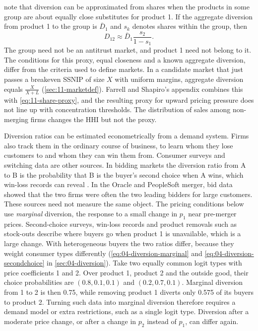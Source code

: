  \citet[Section 2.G]{FarrellShapiro2010} note that diversion can be approximated from
shares when the products in some group are about equally close substitutes for product 1. If the aggregate
diversion from product 1 to the group is $\bar D_1$ and $s_k$ denotes shares within the group, then
\begin{equation}\label{eq:11-share-proxy}
  D_{12} \approx \bar D_1 \frac{s_2}{1 - s_1} .
\end{equation}
The group need not be an antitrust market, and product 1 need not belong to it. The conditions for this proxy, equal
closeness and a known aggregate diversion, differ from the criteria used to define markets. In a candidate market
that just passes a breakeven SSNIP of size $X$ with uniform margins, aggregate diversion equals $\frac{X}{X + L}$
(\cref{sec:11-marketdef}). Farrell and Shapiro's appendix combines this with \eqref{eq:11-share-proxy}, and the
resulting proxy for upward pricing pressure does not line up with concentration thresholds. The distribution of
sales among non-merging firms changes the HHI but not the proxy.

 Diversion ratios can be estimated econometrically from a demand system. Firms also track
them in the ordinary course of business, to learn whom they lose customers to and whom they can win them from.
Consumer surveys and switching data are other sources. In bidding markets the diversion ratio from A to B is the
probability that B is the buyer's second choice when A wins, which win-loss records can reveal
\citep[Section 2.G]{FarrellShapiro2010}. In the Oracle and PeopleSoft merger, bid data showed that the two firms
were often the two leading bidders for large customers. These sources need not measure the same object. The
pricing conditions below use \emph{marginal} diversion, the response to a small change in $p_1$ near pre-merger
prices. Second-choice surveys, win-loss records and product removals such as stock-outs describe where buyers go
when product 1 is unavailable, which is a large change. With heterogeneous buyers the two ratios differ, because
they weight consumer types differently (\eqref{eq:04-diversion-marginal} and \eqref{eq:04-diversion-secondchoice}
in \cref{sec:04-diversion}). Take two equally common logit types with price coefficients 1 and 2. Over product 1,
product 2 and the outside good, their choice probabilities are $(0.8, 0.1, 0.1)$ and $(0.2, 0.7, 0.1)$. Marginal
diversion from 1 to 2 is then 0.75, while removing product 1 diverts only 0.575 of its buyers to product 2. Turning
such data into marginal diversion therefore requires a demand model or extra restrictions, such as a single logit
type. Diversion after a moderate price change, or after a change in $p_2$ instead of $p_1$, can differ again.

